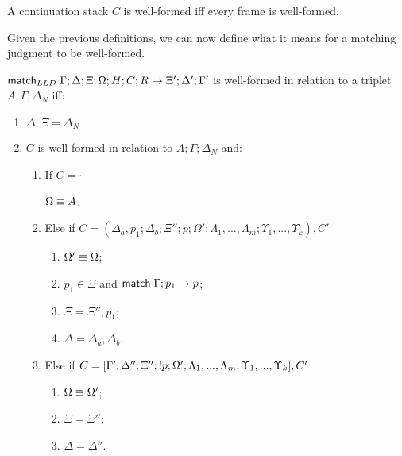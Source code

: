 \begin{definition}
A continuation stack $C$ is well-formed iff every frame is well-formed.
\end{definition}

Given the previous definitions, we can now define what it means for a matching judgment to be well-formed.

\begin{definition}

$\mathsf{match}_{LLD} \; \Gamma; \Delta; \Xi; \Omega; H; C; R \rightarrow \Xi'; \Delta'; \Gamma'$ is well-formed in relation to a triplet $A; \Gamma; \Delta_{N}$ iff:

\begin{enumerate}
   \item $\Delta, \Xi = \Delta_{N}$
   \item $C$ is well-formed in relation to $A; \Gamma; \Delta_{N}$ and:
   \begin{enumerate}
      \item If $C = \cdot$
   
      $\Omega \equiv A$.
   
      \item Else if $C = (\Delta_a, p_1; \Delta_b; \Xi''; p; \Omega'; \Lambda_1, ..., \Lambda_m; \Upsilon_1, ..., \Upsilon_k), C'$
   
      \begin{enumerate}
         \item $\Omega' \equiv \Omega$;
         \item $p_1 \in \Xi$ and $\mathsf{match} \; \Gamma; p_1 \rightarrow p$;
         \item $\Xi = \Xi'', p_1$;
         \item $\Delta = \Delta_a, \Delta_b$.
      \end{enumerate}
      \item Else if $C = [\Gamma'; \Delta''; \Xi''; {!} p; \Omega'; \Lambda_1, ..., \Lambda_m; \Upsilon_1, ..., \Upsilon_k], C'$
      \begin{enumerate}
         \item $\Omega \equiv \Omega'$;
         \item $\Xi = \Xi''$;
         \item $\Delta = \Delta''$.
      \end{enumerate}
   \end{enumerate}
\end{enumerate}

\end{definition}

